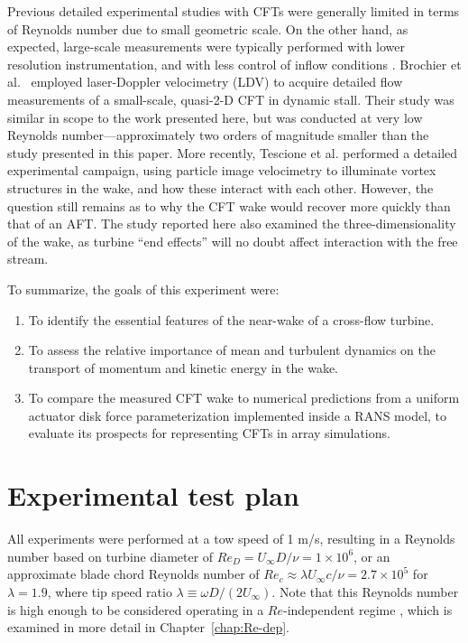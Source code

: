 Previous detailed experimental studies with CFTs were generally limited in terms
of Reynolds number due to small geometric scale. On the other hand, as expected,
large-scale measurements were typically performed with lower resolution
instrumentation, and with less control of inflow conditions
\cite{Vermeulen1979}. Brochier et al.~\cite{Brochier1986} employed laser-Doppler
velocimetry (LDV) to acquire detailed flow measurements of a small-scale,
quasi-2-D CFT in dynamic stall. Their study was similar in scope to the work
presented here, but was conducted at very low Reynolds number---approximately
two orders of magnitude smaller than the study presented in this paper. More
recently, Tescione et al. \cite{Tescione2014} performed a detailed experimental
campaign, using particle image velocimetry to illuminate vortex structures in
the wake, and how these interact with each other. However, the question still
remains as to why the CFT wake would recover more quickly than that of an AFT.
The study reported here also examined the three-dimensionality of the wake, as
turbine ``end effects'' will no doubt affect interaction with the free stream.

To summarize, the goals of this experiment were:
\begin{enumerate}
    \item To identify the essential features of the near-wake of a cross-flow
    turbine.
    
    \item To assess the relative importance of mean and turbulent dynamics on the
    transport of momentum and kinetic energy in the wake.
    
    \item To compare the measured CFT wake to numerical predictions from a
    uniform actuator disk force parameterization implemented inside a RANS
    model, to evaluate its prospects for representing CFTs in array simulations.
\end{enumerate}


\section{Experimental test plan}

All experiments were performed at a tow speed of 1 m/s, resulting in a Reynolds
number based on turbine diameter of $Re_D = U_\infty D /\nu = 1 \times 10^6$, or
an approximate blade chord Reynolds number of $Re_c \approx \lambda U_\infty
c/\nu = 2.7 \times 10^5$ for $\lambda=1.9$, where tip speed ratio $\lambda
\equiv \omega D / (2 U_\infty)$. Note that this Reynolds number is high enough
to be considered operating in a $Re$-independent regime \cite{Bravo2007,
    Bachant2014, Bachant2016-Energies}, which is examined in more detail in
Chapter~\ref{chap:Re-dep}.

